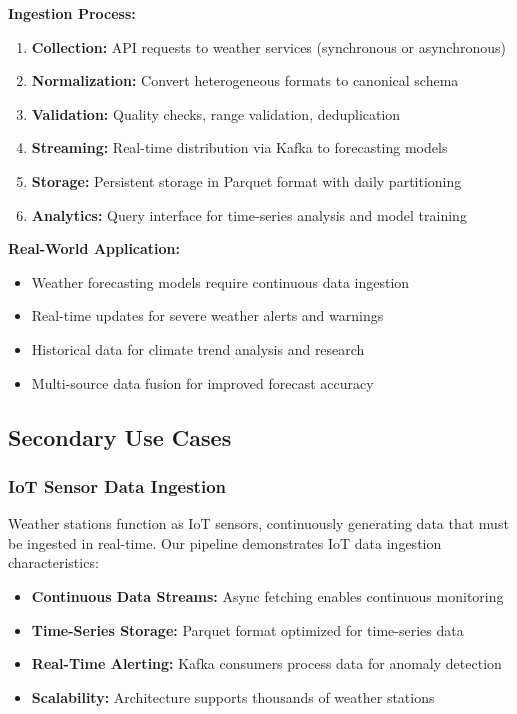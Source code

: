 \documentclass[12pt,a4paper]{article}
\begin{document}
\textbf{Ingestion Process:}
\begin{enumerate}
    \item \textbf{Collection:} API requests to weather services (synchronous or asynchronous)
    \item \textbf{Normalization:} Convert heterogeneous formats to canonical schema
    \item \textbf{Validation:} Quality checks, range validation, deduplication
    \item \textbf{Streaming:} Real-time distribution via Kafka to forecasting models
    \item \textbf{Storage:} Persistent storage in Parquet format with daily partitioning
    \item \textbf{Analytics:} Query interface for time-series analysis and model training
\end{enumerate}

\textbf{Real-World Application:}
\begin{itemize}
    \item Weather forecasting models require continuous data ingestion
    \item Real-time updates for severe weather alerts and warnings
    \item Historical data for climate trend analysis and research
    \item Multi-source data fusion for improved forecast accuracy
\end{itemize}

\subsection{Secondary Use Cases}

\subsubsection{IoT Sensor Data Ingestion}

Weather stations function as IoT sensors, continuously generating data that must be ingested in real-time. Our pipeline demonstrates IoT data ingestion characteristics:

\begin{itemize}
    \item \textbf{Continuous Data Streams:} Async fetching enables continuous monitoring
    \item \textbf{Time-Series Storage:} Parquet format optimized for time-series data
    \item \textbf{Real-Time Alerting:} Kafka consumers process data for anomaly detection
    \item \textbf{Scalability:} Architecture supports thousands of weather stations
\end{itemize}
\end{document}
